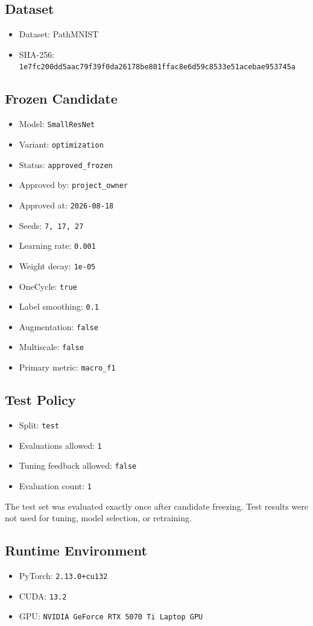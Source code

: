 \documentclass[10pt]{article}
\begin{document}
\subsection{Dataset}
\begin{itemize}
\item Dataset: PathMNIST
\item SHA-256: \texttt{1e7fc200dd5aac79f39f0da26178be801ffac8e6d59c8533e51acebae953745a}
\end{itemize}
\subsection{Frozen Candidate}
\begin{itemize}
\item Model: \texttt{SmallResNet}
\item Variant: \texttt{optimization}
\item Status: \texttt{approved\_frozen}
\item Approved by: \texttt{project\_owner}
\item Approved at: \texttt{2026-08-18}
\item Seeds: \texttt{7, 17, 27}
\item Learning rate: \texttt{0.001}
\item Weight decay: \texttt{1e-05}
\item OneCycle: \texttt{true}
\item Label smoothing: \texttt{0.1}
\item Augmentation: \texttt{false}
\item Multiscale: \texttt{false}
\item Primary metric: \texttt{macro\_f1}
\end{itemize}
\subsection{Test Policy}
\begin{itemize}
\item Split: \texttt{test}
\item Evaluations allowed: \texttt{1}
\item Tuning feedback allowed: \texttt{false}
\item Evaluation count: \texttt{1}
\end{itemize}
The test set was evaluated exactly once after candidate freezing. Test results were not used for tuning, model selection, or retraining.
\subsection{Runtime Environment}
\begin{itemize}
\item PyTorch: \texttt{2.13.0+cu132}
\item CUDA: \texttt{13.2}
\item GPU: \texttt{NVIDIA GeForce RTX 5070 Ti Laptop GPU}
\end{itemize}
\end{document}
